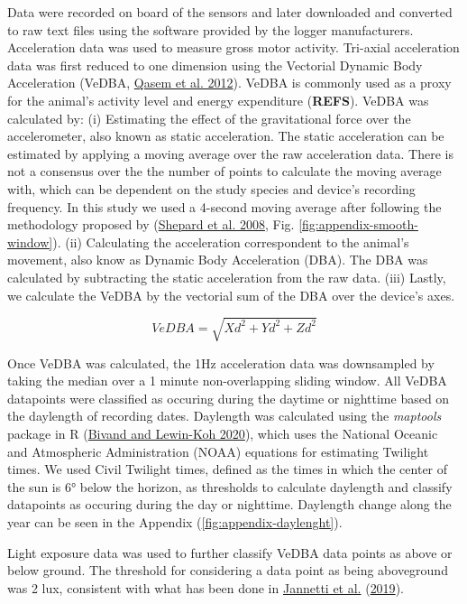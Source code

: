 \documentclass[english,msc,numbers,hidelinks]{coppe}
\begin{document}
  Data were recorded on board of the sensors and later downloaded and converted to raw text files using the software provided by the logger manufacturers. Acceleration data was used to measure gross motor activity. Tri-axial acceleration data was first reduced to one dimension using the Vectorial Dynamic Body Acceleration (VeDBA, \protect\hyperlink{ref-qasem2012}{Qasem et al. 2012}). VeDBA is commonly used as a proxy for the animal's activity level and energy expenditure (\textbf{REFS}). VeDBA was calculated by: (i) Estimating the effect of the gravitational force over the accelerometer, also known as static acceleration. The static acceleration can be estimated by applying a moving average over the raw acceleration data. There is not a consensus over the the number of points to calculate the moving average with, which can be dependent on the study species and device's recording frequency. In this study we used a 4-second moving average after following the methodology proposed by (\protect\hyperlink{ref-shepard2008}{Shepard et al. 2008}, Fig. \ref{fig:appendix-smooth-window}). (ii) Calculating the acceleration correspondent to the animal's movement, also know as Dynamic Body Acceleration (DBA). The DBA was calculated by subtracting the static acceleration from the raw data. (iii) Lastly, we calculate the VeDBA by the vectorial sum of the DBA over the device's axes.

  \[ VeDBA = \sqrt{Xd^2 + Yd^2 + Zd^2} \]

  Once VeDBA was calculated, the 1Hz acceleration data was downsampled by taking the median over a 1 minute non-overlapping sliding window. All VeDBA datapoints were classified as occuring during the daytime or nighttime based on the daylength of recording dates. Daylength was calculated using the \emph{maptools} package in R (\protect\hyperlink{ref-bivand2020}{Bivand and Lewin-Koh 2020}), which uses the National Oceanic and Atmospheric Administration (NOAA) equations for estimating Twilight times. We used Civil Twilight times, defined as the times in which the center of the sun is 6° below the horizon, as thresholds to calculate daylength and classify datapoints as occuring during the day or nighttime. Daylength change along the year can be seen in the Appendix (\ref{fig:appendix-daylenght}).

  Light exposure data was used to further classify VeDBA data points as above or below ground. The threshold for considering a data point as being aboveground was 2 lux, consistent with what has been done in \protect\hyperlink{ref-jannetti2019}{Jannetti et al.} (\protect\hyperlink{ref-jannetti2019}{2019}).
\end{document}
